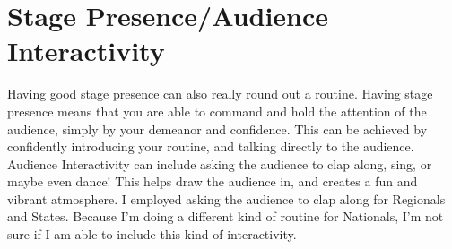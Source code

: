 	\section{Stage Presence/Audience Interactivity}
    	Having good stage presence can also really round out a routine. Having stage presence means that you are able to command and hold the attention of the audience, simply by your demeanor and confidence. This can be achieved by confidently introducing your routine, and talking directly to the audience.\\
        
        Audience Interactivity can include asking the audience to clap along, sing, or maybe even dance! This helps draw the audience in, and creates a fun and vibrant atmosphere. I employed asking the audience to clap along for Regionals and States. Because I'm doing a different kind of routine for Nationals, I'm not sure if I am able to include this kind of interactivity.\\
        
        